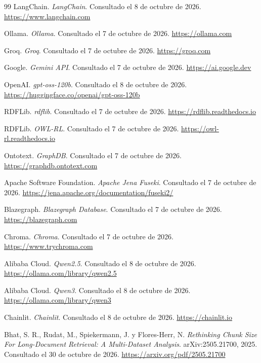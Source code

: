 \documentclass[11pt, a4paper]{report}
\begin{document}
\begin{thebibliography}{99}
		LangChain.
		\textit{LangChain}. Consultado el 8 de octubre de 2026.
		\url{https://www.langchain.com}

		Ollama.
		\textit{Ollama}. Consultado el 7 de octubre de 2026.
		\url{https://ollama.com}

		Groq.
		\textit{Groq}. Consultado el 7 de octubre de 2026.
		\url{https://groq.com}

		Google.
		\textit{Gemini API}. Consultado el 7 de octubre de 2026.
		\url{https://ai.google.dev}

		OpenAI.
		\textit{gpt-oss-120b}. Consultado el 8 de octubre de 2026.
		\url{https://huggingface.co/openai/gpt-oss-120b}

		RDFLib.
		\textit{rdflib}. Consultado el 7 de octubre de 2026.
		\url{https://rdflib.readthedocs.io}

		RDFLib.
		\textit{OWL-RL}. Consultado el 7 de octubre de 2026.
		\url{https://owl-rl.readthedocs.io}

		Ontotext.
		\textit{GraphDB}. Consultado el 7 de octubre de 2026.
		\url{https://graphdb.ontotext.com}

		Apache Software Foundation.
		\textit{Apache Jena Fuseki}. Consultado el 7 de octubre de 2026.
		\url{https://jena.apache.org/documentation/fuseki2/}

		Blazegraph.
		\textit{Blazegraph Database}. Consultado el 7 de octubre de 2026.
		\url{https://blazegraph.com}

		Chroma.
		\textit{Chroma}. Consultado el 7 de octubre de 2026.
		\url{https://www.trychroma.com}

		Alibaba Cloud.
		\textit{Qwen2.5}. Consultado el 8 de octubre de 2026.
		\url{https://ollama.com/library/qwen2.5}

		Alibaba Cloud.
		\textit{Qwen3}. Consultado el 8 de octubre de 2026.
		\url{https://ollama.com/library/qwen3}

		Chainlit.
		\textit{Chainlit}. Consultado el 8 de octubre de 2026.
		\url{https://chainlit.io}

		Bhat, S. R., Rudat, M., Spiekermann, J. y Flores-Herr, N.
		\textit{Rethinking Chunk Size For Long-Document Retrieval: A
		Multi-Dataset Analysis}. arXiv:2505.21700, 2025. Consultado el 30 de
		octubre de 2026.
		\url{https://arxiv.org/pdf/2505.21700}


\end{thebibliography}
\end{document}
